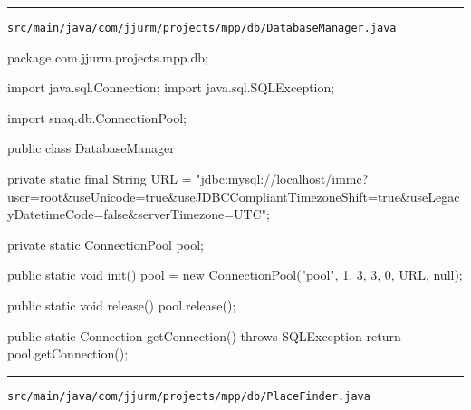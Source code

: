 \noindent\rule{\textwidth}{0.4pt}

\nointerlineskip
\texttt{src/main/java/com/jjurm/projects/mpp/db/DatabaseManager.java}

\begin{javacode}
package com.jjurm.projects.mpp.db;

import java.sql.Connection;
import java.sql.SQLException;

import snaq.db.ConnectionPool;

public class DatabaseManager {

  private static final String URL =
      "jdbc:mysql://localhost/immc?user=root&useUnicode=true&useJDBCCompliantTimezoneShift=true&useLegacyDatetimeCode=false&serverTimezone=UTC";

  private static ConnectionPool pool;

  public static void init() {
    pool = new ConnectionPool("pool", 1, 3, 3, 0, URL, null);
  }

  public static void release() {
    pool.release();
  }

  public static Connection getConnection() throws SQLException {
    return pool.getConnection();
  }

}
\end{javacode}

\noindent\rule{\textwidth}{0.4pt}

\nointerlineskip
\texttt{src/main/java/com/jjurm/projects/mpp/db/PlaceFinder.java}

